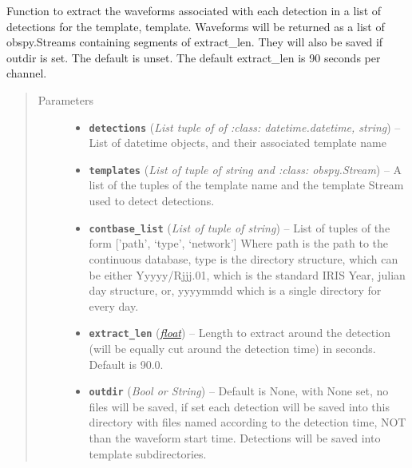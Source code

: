 \documentclass[a4paper,10pt,english]{sphinxmanual}
\begin{document}

\begin{fulllineitems}
\label{utils:clustering.extract_detections}
Function to extract the waveforms associated with each detection in a list
of detections for the template, template.  Waveforms will be returned as
a list of obspy.Streams containing segments of extract\_len.  They will also
be saved if outdir is set.  The default is unset.  The default extract\_len
is 90 seconds per channel.
\begin{quote}\begin{description}
\item[{Parameters}] \leavevmode\begin{itemize}
\item {} 
\textbf{\texttt{detections}} (\emph{List tuple of of :class: datetime.datetime, string}) -- List of datetime objects, and their associated template            name

\item {} 
\textbf{\texttt{templates}} (\emph{List of tuple of string and :class: obspy.Stream}) -- A list of the tuples of the template name and the template            Stream used to detect detections.

\item {} 
\textbf{\texttt{contbase\_list}} (\emph{List of tuple of string}) -- List of tuples of the form {[}'path', `type', `network'{]}                    Where path is the path to the continuous database, type is                    the directory structure, which can be either Yyyyy/Rjjj.01,                    which is the standard IRIS Year, julian day structure, or,                    yyyymmdd which is a single directory for every day.

\item {} 
\textbf{\texttt{extract\_len}} (\href{https://docs.python.org/library/functions.html\#float}{\emph{float}}) -- Length to extract around the detection (will be equally            cut around the detection time) in seconds.  Default is 90.0.

\item {} 
\textbf{\texttt{outdir}} (\emph{Bool or String}) -- Default is None, with None set, no files will be saved,            if set each detection will be saved into this directory with files            named according to the detection time, NOT than the waveform            start time. Detections will be saved into template subdirectories.


\end{itemize}
\end{description}
\end{quote}
\end{fulllineitems}
\end{document}
